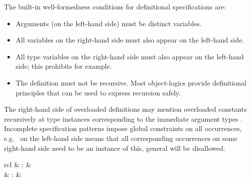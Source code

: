 \begin{isabellebody}
\begin{isamarkuptext}
  \medskip The built-in well-formedness conditions for definitional
  specifications are:

  \begin{itemize}

  \item Arguments (on the left-hand side) must be distinct variables.

  \item All variables on the right-hand side must also appear on the
  left-hand side.

  \item All type variables on the right-hand side must also appear on
  the left-hand side; this prohibits  for example.

  \item The definition must not be recursive.  Most object-logics
  provide definitional principles that can be used to express
  recursion safely.

  \end{itemize}

  The right-hand side of overloaded definitions may mention overloaded constants
  recursively at type instances corresponding to the immediate
  argument types .  Incomplete
  specification patterns impose global constraints on all occurrences,
  e.g.\  on the left-hand side means that all
  corresponding occurrences on some right-hand side need to be an
  instance of this, general  will be disallowed.

  \begin{matharray}{rcl}
    \hypertarget{command.consts}{\hyperlink{command.consts}{\mbox{}}} & : &  \\
    \hypertarget{command.defs}{\hyperlink{command.defs}{\mbox{}}} & : &  \\
  \end{matharray}


\end{isamarkuptext}
\end{isabellebody}
